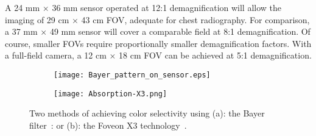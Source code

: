 A 24 mm $\times$ 36 mm sensor operated at 12:1 demagnification will allow the imaging of 29 cm $\times$ 43 cm FOV, adequate for chest radiography. For comparison, a 37 mm $\times$ 49 mm sensor will cover a comparable field at 8:1 demagnification. Of course, smaller FOVs require proportionally smaller demagnification factors.  With a full-field camera, a 12 cm $\times$ 18 cm FOV can be achieved at 5:1 demagnification.

\begin{figure}[h]
	\begin{subfigure}[b]{0.2\linewidth}
		\centering
		\texttt{[image: Bayer\_pattern\_on\_sensor.eps]}
		\caption{}
		\label{fig:bayer_pattern_on_sensor}
	\end{subfigure}
	\hspace{0.5cm}
	\begin{subfigure}[b]{0.65\linewidth}
		\centering
		\texttt{[image: Absorption-X3.png]}
		\caption{}
		\label{fig:foveon_sensor}
	\end{subfigure}
\caption{Two methods of achieving color selectivity using (a): the Bayer filter~\citep{wikibayer}: or (b): the Foveon X3 technology~\citep{wiki_foveon}.}
\label{fig:color_selectivity}	
\end{figure}

